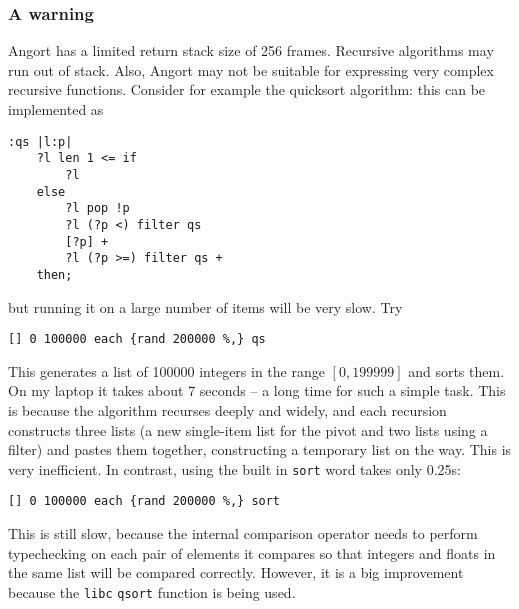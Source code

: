 \subsubsection{A warning}
Angort has a limited return stack size of 256 frames. Recursive algorithms
may run out of stack. Also, Angort may not be suitable for expressing
very complex recursive functions. Consider for example the quicksort algorithm:
this can be implemented as
\begin{lstlisting}
:qs |l:p| 
    ?l len 1 <= if 
        ?l 
    else 
        ?l pop !p 
        ?l (?p <) filter qs 
        [?p] + 
        ?l (?p >=) filter qs + 
    then;
\end{lstlisting}
but running it on a large number of items will be very slow. Try
\begin{lstlisting}
[] 0 100000 each {rand 200000 %,} qs
\end{lstlisting}
This generates a list of 100000 integers in the range $[0,199999]$ and
sorts them. On my laptop it takes about 7 seconds -- a long time for
such a simple task.
This is because the algorithm recurses deeply and widely,
and each recursion constructs 
three lists (a new single-item list for the pivot and two lists
using a filter) and pastes them together, constructing a temporary 
list on the way. This is very inefficient.
In contrast, using the built in \texttt{sort} word takes only 0.25s:
\begin{lstlisting}
[] 0 100000 each {rand 200000 %,} sort
\end{lstlisting}
This is still slow, because the internal comparison operator
needs to perform typechecking on each pair of elements it compares
so that integers and floats in the same list will be compared
correctly. However, it is a big improvement because the \texttt{libc} 
\texttt{qsort} function is being used.


